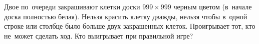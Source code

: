 \begin{problems}
\item
Двое по~очереди закрашивают клетки доски $999 \times 999$ черным цветом
(в~начале доска полностью белая).
Нельзя красить клетку дважды, нельзя чтобы в~одной строке или столбце было
больше двух закрашенных клеток.
Проигрывает тот, кто не~может сделать ход.
Кто выигрывает при правильной игре?

\end{problems}

